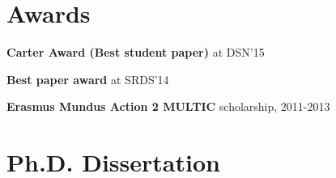 \documentclass[letterpaper]{article}
\renewenvironment{itemize}{
  \begin{list}{}{
    \setlength{\leftmargin}{1.5em}
  }
}{
  \end{list}
}
\begin{document}
\section*{Awards}

\begin{itemize}
\item \textbf{Carter Award (Best student paper)} at DSN'15
\item \textbf{Best paper award} at SRDS'14
\item \textbf{Erasmus Mundus Action 2 MULTIC} scholarship, 2011-2013

\end{itemize}


\section* {Ph.D. Dissertation}
\end{document}
